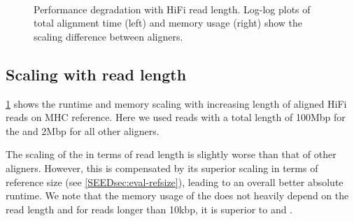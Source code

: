 \begin{figure}[t]
	\centering
	~\hspace{1em} \caption[Performance scaling with query length
  (long reads)]{Performance degradation with HiFi read length. Log-log plots of
  total alignment time (left) and memory usage (right) show the scaling
  difference between aligners.}
	\label{SEEDfig:hifi_scaling_with_readlen}
  \end{figure}

\subsection{Scaling with read length}

\cref{SEEDfig:hifi_scaling_with_readlen} shows the runtime and memory scaling with
increasing length of aligned HiFi reads on MHC reference. Here we used reads
with a total length of 100Mbp for the \sh and 2Mbp for all other aligners.

The scaling of the \sh in terms of read length is slightly worse than that of
other aligners. However, this is compensated by its superior scaling in terms of
reference size (see \cref{SEEDsec:eval-refsize}), leading to an overall better
absolute runtime. We note that the memory usage of the \sh does not heavily
depend on the read length and for reads longer than 10kbp, it is superior to
\graphaligner and \vargas.

